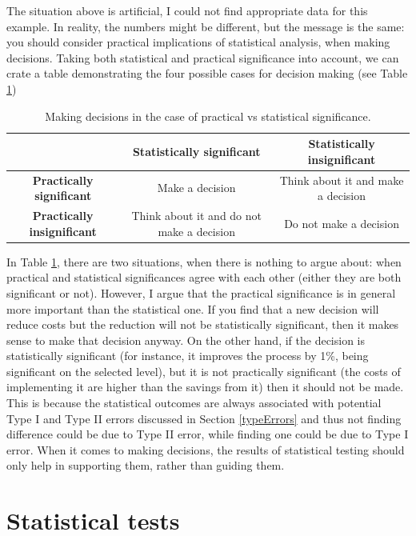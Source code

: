 \documentclass[
]{book}
\theoremstyle{definition}
\theoremstyle{definition}
\theoremstyle{definition}
\theoremstyle{definition}
\theoremstyle{remark}
\begin{document}
The situation above is artificial, I could not find appropriate data for this example. In reality, the numbers might be different, but the message is the same: you should consider practical implications of statistical analysis, when making decisions. Taking both statistical and practical significance into account, we can crate a table demonstrating the four possible cases for decision making (see Table \ref{tab:significanceTable})

\begin{table}

\caption{\label{tab:significanceTable}Making decisions in the case of practical vs statistical significance.}
\centering
\fontsize{12}{14}\selectfont
\begin{tabular}[t]{>{}c|c|c}
\hline
 & Statistically significant & Statistically insignificant\\
\hline
\textbf{Practically significant} & Make a decision & Think about it and make a decision\\
\hline
\textbf{Practically insignificant} & Think about it and do not make a decision & Do not make a decision\\
\hline
\end{tabular}
\end{table}

In Table \ref{tab:significanceTable}, there are two situations, when there is nothing to argue about: when practical and statistical significances agree with each other (either they are both significant or not). However, I argue that the practical significance is in general more important than the statistical one. If you find that a new decision will reduce costs but the reduction will not be statistically significant, then it makes sense to make that decision anyway. On the other hand, if the decision is statistically significant (for instance, it improves the process by 1\%, being significant on the selected level), but it is not practically significant (the costs of implementing it are higher than the savings from it) then it should not be made. This is because the statistical outcomes are always associated with potential Type I and Type II errors discussed in Section \ref{typeErrors} and thus not finding difference could be due to Type II error, while finding one could be due to Type I error. When it comes to making decisions, the results of statistical testing should only help in supporting them, rather than guiding them.

\hypertarget{statisticalTests}{%
\chapter{Statistical tests}\label{statisticalTests}}
\end{document}
